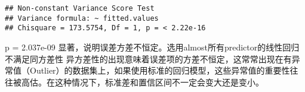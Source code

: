 \documentclass[
]{article}
\begin{document}
\begin{verbatim}
## Non-constant Variance Score Test 
## Variance formula: ~ fitted.values 
## Chisquare = 173.5754, Df = 1, p = < 2.22e-16
\end{verbatim}

p = 2.037e-09
显著，说明误差方差不恒定。选用almost所有predictor的线性回归不满足同方差性
异方差性的出现意味着误差项的方差不恒定，这常常出现在有异常值（Outlier）的数据集上，如果使用标准的回归模型，这些异常值的重要性往往被高估。在这种情况下，标准差和置信区间不一定会变大还是变小。
\end{document}
